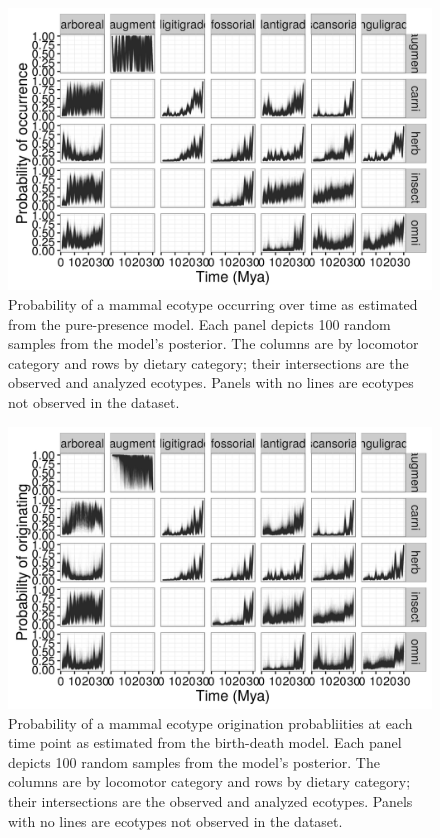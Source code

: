 \documentclass[12pt,letterpaper]{article}
\begin{document}
\begin{figure}[ht]
  \centering
  \includegraphics[width=\textwidth,height=0.8\textheight,keepaspectratio=true]{figure/ecotype_occurrence}
  \caption[Ecotype occurrence probability estimated from the pure-presence model]{Probability of a mammal ecotype occurring over time as estimated from the pure-presence model. Each panel depicts 100 random samples from the model's posterior. The columns are by locomotor category and rows by dietary category; their intersections are the observed and analyzed ecotypes. Panels with no lines are ecotypes not observed in the dataset.}
  \label{fig:eco_occur}
\end{figure}

\begin{figure}[ht]
  \centering
  \includegraphics[width=\textwidth,height=0.8\textheight,keepaspectratio=true]{figure/ecotype_origin_bd}
  \caption[Ecotype origination probability estimated from the birth-death model]{Probability of a mammal ecotype origination probabliities at each time point as estimated from the birth-death model. Each panel depicts 100 random samples from the model's posterior. The columns are by locomotor category and rows by dietary category; their intersections are the observed and analyzed ecotypes. Panels with no lines are ecotypes not observed in the dataset.}
  \label{fig:eco_origin}
\end{figure}
\end{document}
